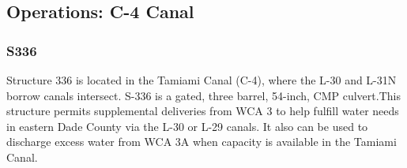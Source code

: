 %
%
%
%


\clearpage
\subsection{Operations: C-4 Canal}

\subsubsection{S336}
Structure 336 is located in the Tamiami Canal (C-4), where the L-30 and L-31N borrow
canals intersect. S-336 is a gated, three barrel, 54-inch, CMP culvert.This structure permits supplemental deliveries from WCA 3 to help fulfill water needs in eastern Dade County via the L-30 or L-29 canals. It also can be used to discharge excess water from WCA 3A when capacity is available in the Tamiami Canal. %


